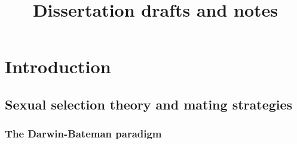 \documentclass[]{article}
\title{Dissertation drafts and notes }
\author{\Large \vspace{0.05in} \newline\normalsize\emph{}  }
\date{}
\newcommand*{\authorfont}{\fontfamily{phv}\selectfont}
\begin{document}
	
%    


{%
\setlength{\parindent}{0pt}
\thispagestyle{plain}
{\fontsize{18}{20}\selectfont\raggedright 
\maketitle  %

}

{
   \vskip 13.5pt\relax \normalsize\fontsize{11}{12} 
\textbf{\authorfont } \hskip 15pt \emph{\small }   

}

}






\vskip 6.5pt


\noindent  \hypertarget{introduction}{%
\section{Introduction}\label{introduction}}

\hypertarget{sexual-selection-theory-and-mating-strategies}{%
\subsection{Sexual selection theory and mating
strategies}\label{sexual-selection-theory-and-mating-strategies}}

\hypertarget{the-darwin-bateman-paradigm}{%
\subsubsection{The Darwin-Bateman
paradigm}\label{the-darwin-bateman-paradigm}}
\end{document}

